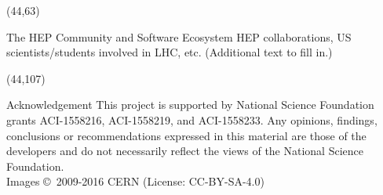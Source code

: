 \documentclass[final]{beamer}
\begin{document}
\begin{frame}{}
\begin{textblock}{38.0}(44,63)
\begin{block}{The HEP Community and Software Ecosystem}
HEP collaborations, US scientists/students involved in LHC, etc. (Additional text to fill in.)
\end{block}
\end{textblock}















\begin{textblock}{38.0}(44,107)
\begin{block}{Acknowledgement}
This project is supported by National Science Foundation grants ACI-1558216, ACI-1558219, and ACI-1558233. Any opinions, findings, conclusions or recommendations expressed in this material are those of the developers and do not necessarily reflect the views of the National Science Foundation. \\
Images \copyright~2009-2016 CERN (License: CC-BY-SA-4.0)

\end{block}
\end{textblock}




\end{frame}
\end{document}
